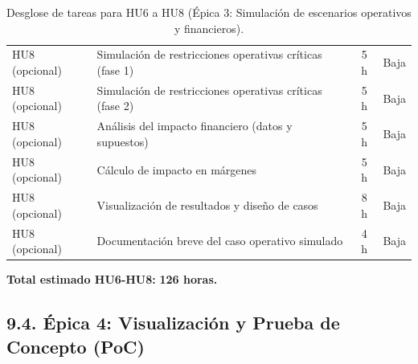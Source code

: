 \documentclass[
11pt, %
]{charter}
\begin{document}
\begin{table}[H]
\begin{tabular}{|l|p{6cm}|c|c|}
\hline
HU8 (opcional) & Simulación de restricciones operativas críticas (fase 1) & 5 h & Baja \\
HU8 (opcional) & Simulación de restricciones operativas críticas (fase 2) & 5 h & Baja \\
HU8 (opcional) & Análisis del impacto financiero (datos y supuestos) & 5 h & Baja \\
HU8 (opcional) & Cálculo de impacto en márgenes & 5 h & Baja \\
HU8 (opcional) & Visualización de resultados y diseño de casos & 8 h & Baja \\
HU8 (opcional) & Documentación breve del caso operativo simulado & 4 h & Baja \\
\hline
\end{tabular}
\caption{Desglose de tareas para HU6 a HU8 (Épica 3: Simulación de escenarios operativos y financieros).}
\end{table}

\vspace{0.5cm}
\noindent
\textbf{Total estimado HU6-HU8:} \textbf{126 horas.}

\subsection*{9.4. Épica 4: Visualización y Prueba de Concepto (PoC)}
\end{document}
